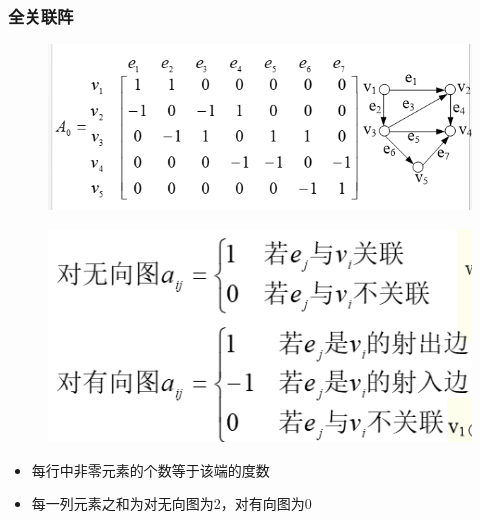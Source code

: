 \subsubsection{全关联阵}
\begin{figure}[H]
	\centering
	\includegraphics[width=0.7\linewidth]{figures/screenshot060}
	\caption{}
	\label{fig:screenshot060}
\end{figure}
\begin{figure}[H]
	\centering
	\includegraphics[width=0.7\linewidth]{figures/screenshot061}
	\caption{}
	\label{fig:screenshot061}
\end{figure}
\begin{itemize}
	\item 每行中非零元素的个数等于该端的度数
	\item 每一列元素之和为对无向图为2，对有向图为0
\end{itemize}
